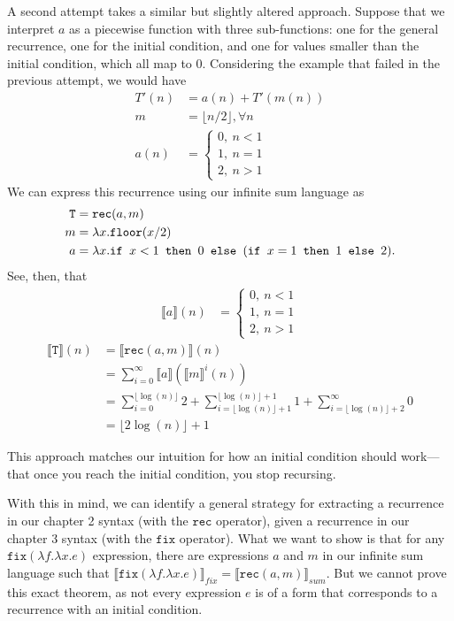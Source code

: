 A second attempt takes a similar but slightly altered approach. Suppose that we interpret $a$ as a piecewise function with three sub-functions:
one for the general recurrence, one for the initial condition, and one for values smaller than the initial condition, which all
map to $0$. Considering the example that failed in the previous attempt, we would have
\begin{align*}
T'(n) &= a(n) + T'(m(n)) \\
m &= \lfloor n/2 \rfloor, \forall n \\
a(n) &=
\begin{cases}
0, \ n < 1 \\
1, \ n = 1 \\
2, \ n > 1
\end{cases}
\end{align*}
We can express this recurrence using our infinite sum language as
\begin{align*}
\texttt{T} &= \texttt{rec}(a,m) \\
m &= \lambda x.\texttt{floor}(x/2) \\
a &= \lambda x.\texttt{if } x <1 \texttt{ then } 0 \texttt{ else } (\texttt{if } x = 1 \texttt{ then } 1 \texttt{ else } 2).
\end{align*}
See, then, that
\begin{align*}
\llbracket a \rrbracket(n) &= 
 \begin{cases}
0, \ n < 1 \\
1, \ n = 1 \\
2, \ n > 1 
\end{cases} 
\end{align*}
\begin{align*}
\llbracket \texttt{T} \rrbracket(n) &= \llbracket \texttt{rec}(a,m)\rrbracket(n) \\
&= \sum_{i=0}^{\infty}\llbracket a \rrbracket(\llbracket m\rrbracket^i(n)) \\
&= \sum_{i=0}^{\lfloor \log(n) \rfloor} 2 + \sum_{i=\lfloor \log(n) \rfloor+1 }^{\lfloor \log(n) \rfloor+1} 1 + \sum_{i =\lfloor \log(n) \rfloor + 2}^{\infty} 0 \\
&= \lfloor 2\log(n) \rfloor + 1
\end{align*}

This approach matches our intuition for how an initial condition should work---that once you reach the initial condition,
you stop recursing. 

With this in mind, we can identify a general strategy for extracting a recurrence in our chapter 2 syntax (with
the $\texttt{rec}$ operator), given a recurrence in our chapter 3 syntax (with the $\texttt{fix}$ operator). 
What we want to show is that for any $\texttt{fix}(\lambda f. \lambda x.e)$ expression, there are expressions $a$ and $m$
in our infinite sum language such that $\llbracket \texttt{fix}(\lambda f.\lambda x.e)\rrbracket_{fix} = 
\llbracket \texttt{rec}(a,m)\rrbracket_{sum}$. But we cannot prove this exact theorem, as not every
expression $e$ is of a form that corresponds to a recurrence with an initial condition.

